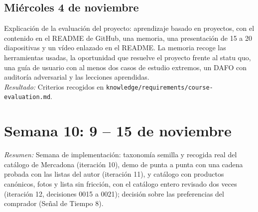 \documentclass[11pt,a4paper]{article}
\newcommand{\actividad}[3]{\item[\textbf{[#1]}] #2 \\ \textit{Resultado:} #3}
\begin{document}
	\subsection*{Miércoles 4 de noviembre}
	\begin{description}[leftmargin=0pt, itemsep=6pt]
		\actividad{Clase}{Explicación de la evaluación del proyecto: aprendizaje basado en proyectos, con el contenido en el README de GitHub, una memoria, una presentación de 15 a 20 diapositivas y un vídeo enlazado en el README. La memoria recoge las herramientas usadas, la oportunidad que resuelve el proyecto frente al statu quo, una guía de usuario con al menos dos casos de estudio extremos, un DAFO con auditoría adversarial y las lecciones aprendidas.}{Criterios recogidos en \texttt{knowledge/requirements/course-evaluation.md}.}
	\end{description}

	\section*{Semana 10: 9 -- 15 de noviembre}
	\textit{Resumen:} Semana de implementación: taxonomía semilla y recogida real del catálogo de Mercadona (iteración 10), demo de punta a punta con una cadena probada con las listas del autor (iteración 11), y catálogo con productos canónicos, fotos y lista sin fricción, con el catálogo entero revisado dos veces (iteración 12, decisiones 0015 a 0021); decisión sobre las preferencias del comprador (Señal de Tiempo 8).
\end{document}
